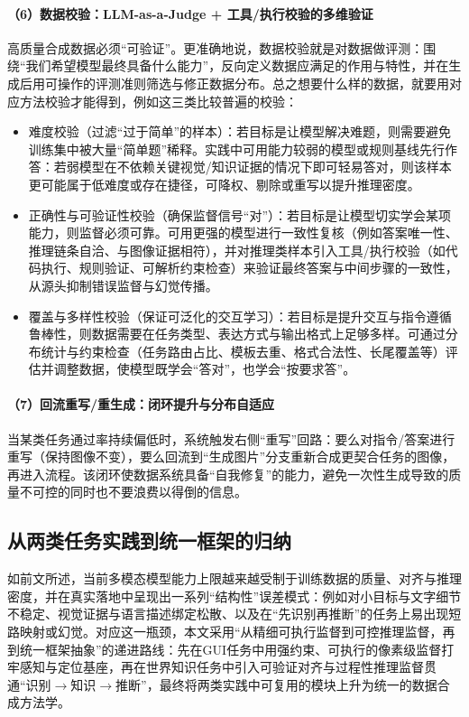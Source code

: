 \paragraph{（6）数据校验：LLM-as-a-Judge + 工具/执行校验的多维验证}
高质量合成数据必须“可验证”。更准确地说，数据校验就是对数据做评测：围绕“我们希望模型最终具备什么能力”，反向定义数据应满足的作用与特性，并在生成后用可操作的评测准则筛选与修正数据分布。总之想要什么样的数据，就要用对应方法校验才能得到，例如这三类比较普遍的校验：
\begin{itemize}
  \item 难度校验（过滤“过于简单”的样本）：若目标是让模型解决难题，则需要避免训练集中被大量“简单题”稀释。实践中可用能力较弱的模型或规则基线先行作答：若弱模型在不依赖关键视觉/知识证据的情况下即可轻易答对，则该样本更可能属于低难度或存在捷径，可降权、剔除或重写以提升推理密度。
  \item 正确性与可验证性校验（确保监督信号“对”）：若目标是让模型切实学会某项能力，则监督必须可靠。可用更强的模型进行一致性复核（例如答案唯一性、推理链条自洽、与图像证据相符），并对推理类样本引入工具/执行校验（如代码执行、规则验证、可解析约束检查）来验证最终答案与中间步骤的一致性，从源头抑制错误监督与幻觉传播。
  \item 覆盖与多样性校验（保证可泛化的交互学习）：若目标是提升交互与指令遵循鲁棒性，则数据需要在任务类型、表达方式与输出格式上足够多样。可通过分布统计与约束检查（任务路由占比、模板去重、格式合法性、长尾覆盖等）评估并调整数据，使模型既学会“答对”，也学会“按要求答”。
\end{itemize}

\paragraph{（7）回流重写/重生成：闭环提升与分布自适应}
当某类任务通过率持续偏低时，系统触发右侧“重写”回路：要么对指令/答案进行重写（保持图像不变），要么回流到“生成图片”分支重新合成更契合任务的图像，再进入流程。该闭环使数据系统具备“自我修复”的能力，避免一次性生成导致的质量不可控的同时也不要浪费以得倒的信息。

\subsection{从两类任务实践到统一框架的归纳}
如前文所述，当前多模态模型能力上限越来越受制于训练数据的质量、对齐与推理密度，并在真实落地中呈现出一系列“结构性”误差模式：例如对小目标与文字细节不稳定、视觉证据与语言描述绑定松散、以及在“先识别再推断”的任务上易出现短路映射或幻觉。对应这一瓶颈，本文采用“从精细可执行监督到可控推理监督，再到统一框架抽象”的递进路线：先在GUI任务中用强约束、可执行的像素级监督打牢感知与定位基座，再在世界知识任务中引入可验证对齐与过程性推理监督贯通“识别$\rightarrow$知识$\rightarrow$推断”，最终将两类实践中可复用的模块上升为统一的数据合成方法学。

